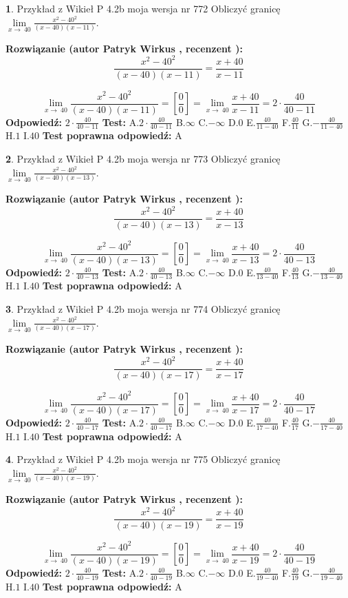 \documentclass[12pt, a4paper]{article}
\theoremstyle{definition} %
\newtheorem{zad}{}
\newcommand{\zadStart}[1]{\begin{zad}#1\newline}
\newcommand{\zadStop}{\end{zad}}
\newcommand{\rozwStart}[2]{\noindent \textbf{Rozwiązanie (autor #1 , recenzent #2): }\newline}
\newcommand{\rozwStop}{\newline}
\newcommand{\odpStart}{\noindent \textbf{Odpowiedź:}\newline}
\newcommand{\odpStop}{\newline}
\newcommand{\testStart}{\noindent \textbf{Test:}\newline}
\newcommand{\testStop}{\newline}
\newcommand{\kluczStart}{\noindent \textbf{Test poprawna odpowiedź:}\newline}
\newcommand{\kluczStop}{\newline}
\begin{document}
\zadStart{Przykład z Wikieł P 4.2b moja wersja nr 772}
Obliczyć granicę $\lim\limits_{x\to\ 40}\frac{x^{2}-40^{2}}{(x-40)(x-11)}$.
\zadStop
\rozwStart{Patryk Wirkus}{}
$$\frac{x^{2}-40^{2}}{(x-40)(x-11)}=\frac{x+40}{x-11}$$

$$\lim\limits_{x\to\ 40}\frac{x^{2}-40^{2}}{(x-40)(x-11)}=[\frac{0}{0}]=\lim\limits_{x\to\ 40}\frac{x+40}{x-11}=2 \cdot \frac{40}{40-11}$$
\rozwStop
\odpStart
$2 \cdot \frac{40}{40-11}$
\odpStop
\testStart
A.$2 \cdot \frac{40}{40-11}$
B.$\infty$
C.$-\infty$
D.$0$
E.$\frac{40}{11-40}$
F.$\frac{40}{11}$
G.$-\frac{40}{11-40}$
H.$1$
I.$40$
\testStop
\kluczStart
A
\kluczStop



\zadStart{Przykład z Wikieł P 4.2b moja wersja nr 773}
Obliczyć granicę $\lim\limits_{x\to\ 40}\frac{x^{2}-40^{2}}{(x-40)(x-13)}$.
\zadStop
\rozwStart{Patryk Wirkus}{}
$$\frac{x^{2}-40^{2}}{(x-40)(x-13)}=\frac{x+40}{x-13}$$

$$\lim\limits_{x\to\ 40}\frac{x^{2}-40^{2}}{(x-40)(x-13)}=[\frac{0}{0}]=\lim\limits_{x\to\ 40}\frac{x+40}{x-13}=2 \cdot \frac{40}{40-13}$$
\rozwStop
\odpStart
$2 \cdot \frac{40}{40-13}$
\odpStop
\testStart
A.$2 \cdot \frac{40}{40-13}$
B.$\infty$
C.$-\infty$
D.$0$
E.$\frac{40}{13-40}$
F.$\frac{40}{13}$
G.$-\frac{40}{13-40}$
H.$1$
I.$40$
\testStop
\kluczStart
A
\kluczStop



\zadStart{Przykład z Wikieł P 4.2b moja wersja nr 774}
Obliczyć granicę $\lim\limits_{x\to\ 40}\frac{x^{2}-40^{2}}{(x-40)(x-17)}$.
\zadStop
\rozwStart{Patryk Wirkus}{}
$$\frac{x^{2}-40^{2}}{(x-40)(x-17)}=\frac{x+40}{x-17}$$

$$\lim\limits_{x\to\ 40}\frac{x^{2}-40^{2}}{(x-40)(x-17)}=[\frac{0}{0}]=\lim\limits_{x\to\ 40}\frac{x+40}{x-17}=2 \cdot \frac{40}{40-17}$$
\rozwStop
\odpStart
$2 \cdot \frac{40}{40-17}$
\odpStop
\testStart
A.$2 \cdot \frac{40}{40-17}$
B.$\infty$
C.$-\infty$
D.$0$
E.$\frac{40}{17-40}$
F.$\frac{40}{17}$
G.$-\frac{40}{17-40}$
H.$1$
I.$40$
\testStop
\kluczStart
A
\kluczStop



\zadStart{Przykład z Wikieł P 4.2b moja wersja nr 775}
Obliczyć granicę $\lim\limits_{x\to\ 40}\frac{x^{2}-40^{2}}{(x-40)(x-19)}$.
\zadStop
\rozwStart{Patryk Wirkus}{}
$$\frac{x^{2}-40^{2}}{(x-40)(x-19)}=\frac{x+40}{x-19}$$

$$\lim\limits_{x\to\ 40}\frac{x^{2}-40^{2}}{(x-40)(x-19)}=[\frac{0}{0}]=\lim\limits_{x\to\ 40}\frac{x+40}{x-19}=2 \cdot \frac{40}{40-19}$$
\rozwStop
\odpStart
$2 \cdot \frac{40}{40-19}$
\odpStop
\testStart
A.$2 \cdot \frac{40}{40-19}$
B.$\infty$
C.$-\infty$
D.$0$
E.$\frac{40}{19-40}$
F.$\frac{40}{19}$
G.$-\frac{40}{19-40}$
H.$1$
I.$40$
\testStop
\kluczStart
A
\kluczStop
\end{document}
